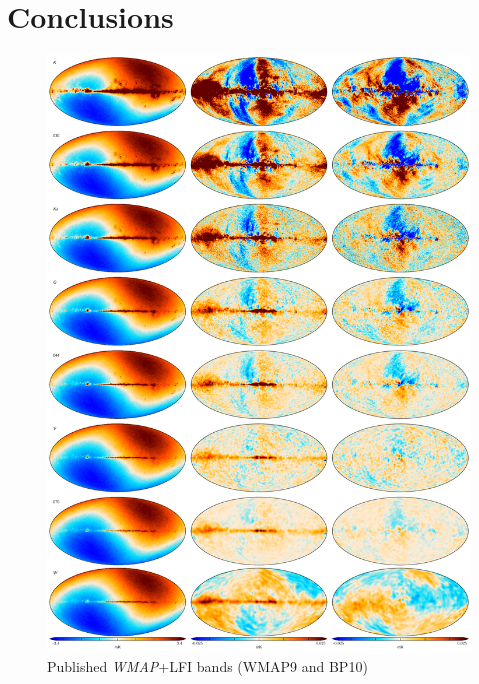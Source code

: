 \documentclass[twocolumn]{../../common/aa}
\begin{document}
\section{Conclusions}
\label{sec:conclusions}

\begin{figure}
	\centering
	\includegraphics[width=0.93\linewidth]{figures/megaplot_official.pdf}
  \caption{Published \textit{WMAP}+LFI bands (WMAP9 and BP10)}
\end{figure}
\end{document}

